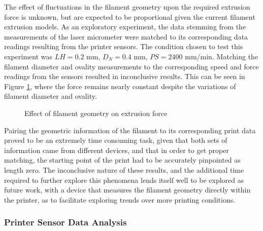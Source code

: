 \documentclass[main.tex]{subfiles}
\begin{document}
The effect of fluctuations in the filament geometry upon the required extrusion force is unknown, but are expected to be proportional given the current filament extrusion models. As an exploratory experiment, the data stemming from the measurements of the laser micrometer were matched to its corresponding data readings resulting from the printer sensors. The condition chosen to test this experiment was $LH = 0.2 \text{ mm}$, $D_{N} = 0.4 \text{ mm}$, $PS = 2400 \text{ mm/min}$. Matching the filament diameter and ovality measurements to the corresponding speed and force readings from the sensors resulted in inconclusive results. This can be seen in Figure \ref{fig:f_O_D}, where the force remains nearly constant despite the variations of filament diameter and ovality. 

\begin{figure}[!htbp]
	\center
	\linebreak
	\caption{Effect of filament geometry on extrusion force} \label{fig:f_O_D}
\end{figure}

Pairing the geometric information of the filament to its corresponding print data proved to be an extremely time consuming task, given that both sets of information came from different devices, and that in order to get proper matching, the starting point of the print had to be accurately pinpointed as length zero. The inconclusive nature of  these results, and the additional time required to further explore this phenomena lends itself well to be explored as future work, with a device that measures the filament geometry directly within the printer, as to facilitate exploring trends over more printing conditions. 

\subsubsection{Printer Sensor Data Analysis}
\end{document}
